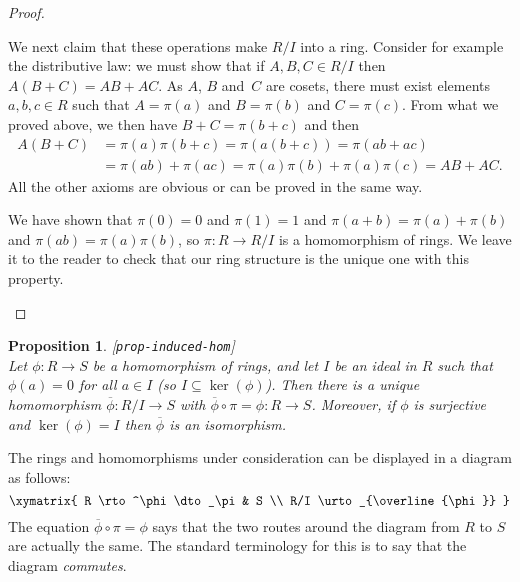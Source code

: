 \documentclass{amsart}
\newcommand{\lbl}[1]{\label{#1}\textup{[\texttt{#1}]}\ \\}
\newcommand{\lbl}{\label}
\newcommand{\ov}[1]     {\overline{#1}}
\newcommand{\sse}       {\subseteq}
\renewcommand{\:}{\colon}
\newtheorem{proposition}[theorem]{Proposition}
\theoremstyle{definition}
\begin{document}
\begin{proof}
\begin{itemize}
   We next claim that these operations make $R/I$ into a ring.
   Consider for example the distributive law: we must show that if
   $A,B,C\in R/I$ then $A(B+C)=AB+AC$.  As $A$, $B$ and~$C$ are
   cosets, there must exist elements $a,b,c\in R$ such that $A=\pi(a)$
   and $B=\pi(b)$ and $C=\pi(c)$.  From what we proved above, we then
   have $B+C=\pi(b+c)$ and then 
   \begin{align*}
    A(B+C) &= \pi(a)\pi(b+c)=\pi(a(b+c))=\pi(ab+ac) \\
     &= \pi(ab)+\pi(ac) = \pi(a)\pi(b)+\pi(a)\pi(c) =AB+AC.
   \end{align*}
   All the other axioms are obvious or can be proved in the same way. 

   We have shown that $\pi(0)=0$ and $\pi(1)=1$ and
   $\pi(a+b)=\pi(a)+\pi(b)$ and $\pi(ab)=\pi(a)\pi(b)$, so
   $\pi\:R\to R/I$ is a homomorphism of rings.  We leave it to the
   reader to check that our ring structure is the unique one with this
   property. 
 \end{itemize}
\end{proof}

\begin{proposition}\lbl{prop-induced-hom}
 Let $\phi\:R\to S$ be a homomorphism of rings, and let $I$ be an
 ideal in $R$ such that $\phi(a)=0$ for all $a\in I$ (so
 $I\sse\ker(\phi)$).  Then there is a unique homomorphism
 $\ov{\phi}\:R/I\to S$ with $\ov{\phi}\circ\pi=\phi\:R\to S$.
 Moreover, if $\phi$ is surjective and $\ker(\phi)=I$ then $\ov{\phi}$
 is an isomorphism.
\end{proposition}
The rings and homomorphisms under consideration can be displayed in a
diagram as follows:
\[ \xymatrix{
     R \rto^\phi \dto_\pi & S \\ R/I \urto_{\ov{\phi}}
   }
\]
The equation $\ov{\phi}\circ\pi=\phi$ says that the two routes around
the diagram from $R$ to $S$ are actually the same.  The standard
terminology for this is to say that the diagram \emph{commutes}.
\end{document}
